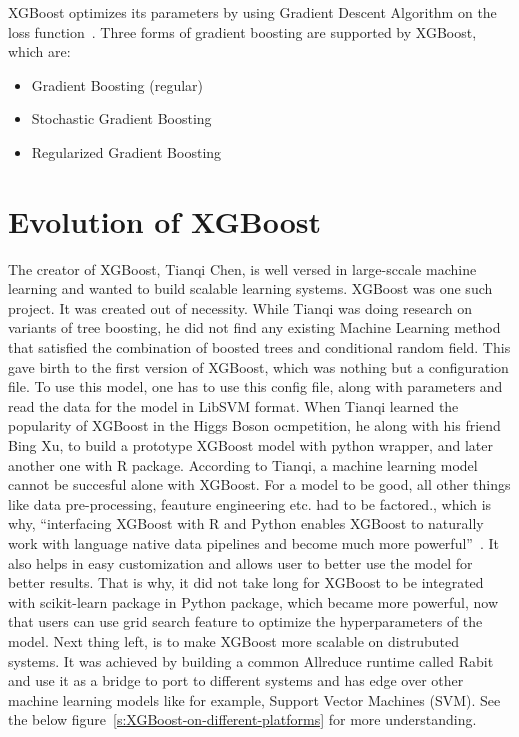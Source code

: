 XGBoost optimizes its parameters by using Gradient Descent Algorithm on the 
loss function~\cite{hid-sp18-401-XGBoost-MLmastery}. Three forms of gradient
boosting  are supported by XGBoost, which are:

\begin{itemize}
\item Gradient Boosting (regular)
\item Stochastic Gradient Boosting
\item Regularized Gradient Boosting 
\end{itemize}

\section{Evolution of XGBoost} 

The creator of XGBoost, Tianqi Chen, is well versed in large-sccale machine
learning and wanted to build scalable learning systems. XGBoost was one such
project. It was created out of necessity. While Tianqi was doing research on
variants of tree boosting, he did not find any existing Machine Learning
method that satisfied the  combination of boosted trees and conditional random
field. This gave birth to the first version of XGBoost, which was nothing but
a configuration file. To use this model,  one has to use this config file,
along with parameters and read the data for the model in LibSVM format. When
Tianqi learned the popularity of XGBoost in the Higgs Boson ocmpetition, he
along with his friend Bing Xu, to build a prototype XGBoost model with python
wrapper, and later another one with R package. According to Tianqi, a machine
learning model cannot be succesful alone with XGBoost. For a model to be good,
all other things like data pre-processing, feauture engineering etc. had to be
factored., which is why, ``interfacing XGBoost with R and Python enables
XGBoost to naturally work with language native data pipelines and become much
more powerful''~\cite{hid-sp18-401-XGBoost-evolution}. It also helps in easy
customization and allows user to better use the model for better results. That
is why, it did not take long for XGBoost to be integrated with scikit-learn
package in Python package, which became more powerful, now that users can use
grid search feature to optimize the hyperparameters of the model. Next thing
left, is to make XGBoost more scalable on distrubuted systems. It was achieved
by building a common Allreduce runtime called Rabit and use it as a bridge to
port to different systems and  has edge over other machine learning models
like for example, Support Vector Machines (SVM).
See the below figure~\ref{s:XGBoost-on-different-platforms} for more
understanding.

